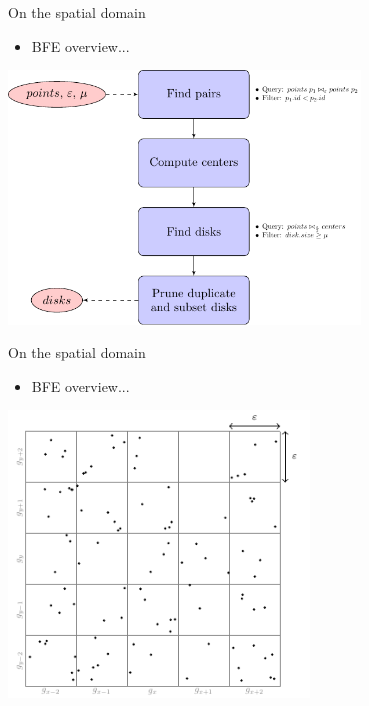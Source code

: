 \documentclass{beamer}
\begin{document}
    \begin{frame}{On the spatial domain}
        \begin{itemize} \item BFE overview... \end{itemize} \vspace{0.5cm}

        \centering
        \includegraphics[width=0.7\textwidth]{figures/MF_flowchart}
    \end{frame}

    \begin{frame}{On the spatial domain}
        \begin{itemize} \item BFE overview... \end{itemize} \vspace{0.5cm}

        \centering
        \includegraphics[page=2,width=0.6\textwidth]{figures/grid}
    \end{frame}
\end{document}
